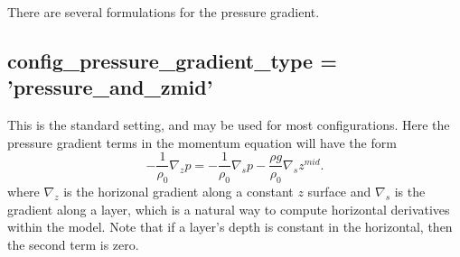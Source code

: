 There are several formulations for the pressure gradient.

\subsection{ config\_pressure\_gradient\_type = 'pressure\_and\_zmid'}
This is the standard setting, and may be used for most configurations.  Here the pressure gradient terms in the momentum equation will have the form
\begin{equation}
\label{ocean:\mode_grad p}
- \frac{1}{\rho_0}\nabla_z p = - \frac{1}{\rho_0}\nabla_s p - \frac{\rho g}{\rho_0}\nabla_s z^{mid}.
\end{equation}
where $\nabla_z$ is the horizonal gradient along a constant $z$ surface and $\nabla_s$ is the gradient along a layer, which is a natural way to compute horizontal derivatives within the model.  Note that if a layer's depth is constant in the horizontal, then the second term is zero.

